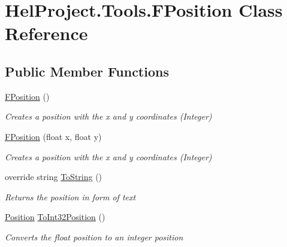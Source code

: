 \hypertarget{class_hel_project_1_1_tools_1_1_f_position}{}\section{Hel\+Project.\+Tools.\+F\+Position Class Reference}
\label{class_hel_project_1_1_tools_1_1_f_position}
\subsection*{Public Member Functions}
\begin{DoxyCompactItemize}
\item 
\hyperlink{class_hel_project_1_1_tools_1_1_f_position_ae958eb23baa81c6d8ee9417ceed38033}{F\+Position} ()
\begin{DoxyCompactList}\small\item\em Creates a position with the x and y coordinates (Integer) \end{DoxyCompactList}\item 
\hyperlink{class_hel_project_1_1_tools_1_1_f_position_af3abb55e2c7962e9d275f3591636ae88}{F\+Position} (float x, float y)
\begin{DoxyCompactList}\small\item\em Creates a position with the x and y coordinates (Integer) \end{DoxyCompactList}\item 
override string \hyperlink{class_hel_project_1_1_tools_1_1_f_position_ab1ff6456275a760c96cf7dbc7c98d781}{To\+String} ()
\begin{DoxyCompactList}\small\item\em Returns the position in form of text \end{DoxyCompactList}\item 
\hyperlink{class_hel_project_1_1_tools_1_1_position}{Position} \hyperlink{class_hel_project_1_1_tools_1_1_f_position_a8dcba2bee67f6f011647c8d242f22823}{To\+Int32\+Position} ()
\begin{DoxyCompactList}\small\item\em Converts the float position to an integer position \end{DoxyCompactList}\end{DoxyCompactItemize}

